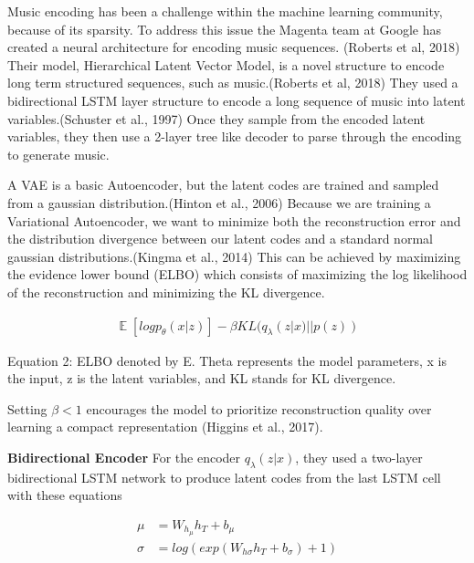 \documentclass{article}
\DeclareMathOperator{\E}{\mathbb{E}}
\begin{document}
Music encoding has been a challenge within the machine learning community, because of its sparsity. To address this issue the Magenta team at Google has created a neural architecture for encoding music sequences. (Roberts et al, 2018)  Their model, Hierarchical Latent Vector Model, is a novel structure to encode long term structured sequences, such as music.(Roberts et al, 2018) They used a bidirectional LSTM layer structure to encode a long sequence of music into latent variables.(Schuster et al., 1997)  Once they sample from the encoded latent variables, they then use a 2-layer tree like decoder to parse through the encoding to generate music.

A VAE is a basic Autoencoder, but the latent codes are trained and sampled from a gaussian distribution.(Hinton et al., 2006) Because we are training a Variational Autoencoder, we want to minimize both the reconstruction error and the distribution divergence between our latent codes and a standard normal gaussian distributions.(Kingma et al., 2014) This can be achieved by maximizing the evidence lower bound (ELBO) which consists of maximizing the log likelihood of the reconstruction and minimizing the KL divergence.

\begin{equation} 
\begin{split}
	\E [ log p_\theta(x|z) ] - \beta KL(q_\lambda(z|x) || p(z))
\end{split} 
\end{equation}

Equation 2: ELBO denoted by E. Theta represents the model parameters, x is the input, z is the latent variables, and KL stands for KL divergence.

Setting $\beta < 1$ encourages the model to prioritize reconstruction quality over learning a compact representation (Higgins et al., 2017).

\textbf{Bidirectional Encoder} For the encoder $q_\lambda(z | x)$, they used a two-layer bidirectional LSTM network to produce latent codes from the last LSTM cell with these equations

\begin{equation} 
\begin{split}
	\mu & = W_{h_\mu}h_T + b_\mu \\
	\sigma & = log(exp(W_{h\sigma}h_T + b_\sigma) + 1) \\
\end{split} 
\end{equation}
\end{document}
